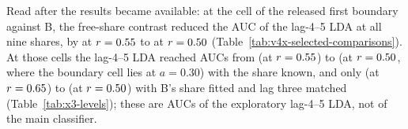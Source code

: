 Read after the results became available: at the cell of the released first boundary against B, the free-share contrast reduced the AUC of the lag-4--5 LDA at all nine shares, by  at $r=\resultnum{j.x3.auc_reduction.min.r}{0.55}$ to  at $r=\resultnum{j.x3.auc_reduction.max.r}{0.50}$ (Table~\ref{tab:v4x-selected-comparisons}).
At those cells the lag-4--5 LDA reached AUCs from  (at $r=\resultnum{j.x3.known.auc.min.r}{0.55}$) to  (at $r=\resultnum{j.x3.known.auc.max.r}{0.50}$, where the boundary cell lies at $a=0.30$) with the share known, and only  (at $r=\resultnum{j.x3.free.auc.min.r}{0.65}$) to  (at $r=\resultnum{j.x3.free.auc.max.r}{0.50}$) with B's share fitted and lag three matched (Table~\ref{tab:x3-levels}); these are AUCs of the exploratory lag-4--5 LDA, not of the main classifier.
